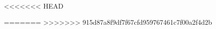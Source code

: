 <<<<<<< HEAD
\newcommand{\I}{\mathcal{I}}
\newcommand{\M}{\mathcal{M}}
\newcommand{\timestr}{\mathcal{T}}

=======
>>>>>>> 915d87a8f9df7f67cfd959767461c7f00a2f4d2b
\newcommand{\D}{\mathcal{D}}
\newcommand{\C}{\mathcal{C}}

\newcommand{\U}{\mathbf{U}}
\newcommand{\Snc}{\mathbf{S}}
\newcommand{\T}{\mathbf{T}}
\newcommand{\R}{\mathbf{R}}

\newcommand{\Nat}{\mathbb{N}}
\newcommand{\Z}{\mathbb{Z}}
\newcommand{\Real}{\mathbb{R}}
\newcommand{\Q}{\mathbb{Q}}


\newcommand{\X}[1]{\mathbf{X}\left(#1\right)}
\newcommand{\Y}[1]{\mathbf{Y}\left(#1\right)}

\newcommand{\X}{\mathbf{X}}
\newcommand{\Y}{\mathbf{Y}}


\newcommand{\Zed}{\mathbf{Z}}
\newcommand{\Lng}{\mathscr {L}}
\newcommand{\iFF}{\Leftrightarrow}
\newcommand{\niFF}{\nLeftrightarrow}
\newcommand{\SNC}{{\mathcal S}}
\newcommand{\TRG}{{\mathcal T}}
\newcommand{\zot}{$\mathds{Z}$ot}
\newcommand{\G}[1]{\mathbf{G}\left(#1\right)}
\newcommand{\F}[1]{\mathbf{F}\left(#1\right)}

\newcommand{\triple}[3]{(#1, #2, #3)}
\newcommand{\pair}[2]{(#1, #2)}
\newcommand{\siff}{\Leftrightarrow}
\newcommand{\A}{\mathcal{A}}
\newcommand{\aX}{\mathrm{X}}
\newcommand{\aY}{\mathrm{Y}}
\newcommand{\x}{\mathbf{x}}
\newcommand{\eqdef}{\stackrel{\mbox{\begin{tiny}def\end{tiny}}}{=}} %
\newcommand{\iFFdef}{\stackrel{\mbox{\begin{tiny}def\end{tiny}}}{\iFF}}
\newcommand{\step}[1]{\xrightarrow{#1}}

\newcommand{\pspace}{\textsc{PSpace}}


\makeatletter
\def\Eqlfill@{\arrowfill@\Relbar\Relbar\Relbar}
\newcommand{\longmodels}[1][]{\,|\!\!\!\ext@arrow 0359\Eqlfill@{#1}}
\makeatother

\newcommand{\symodels}{\longmodels{\mbox{\it{\tiny sym}}}}

\newcommand{\intervaLii}[2]{[#1,#2]}
\newcommand{\intervaLie}[2]{[#1,#2)}
\newcommand{\intervaLee}[2]{(#1,#2)}

\newcommand{\interval}[2]{\langle #1,#2 \rangle}

\newcommand{\set}[1]{\{ #1 \}}

